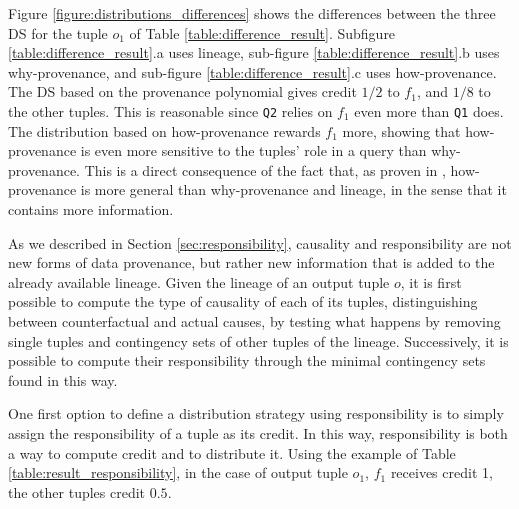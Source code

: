 Figure \ref{figure:distributions_differences} shows the differences between the three DS for the tuple $o_1$ of Table \ref{table:difference_result}. Subfigure \ref{table:difference_result}.a uses lineage, sub-figure \ref{table:difference_result}.b uses why-provenance, and sub-figure \ref{table:difference_result}.c uses how-provenance. 
The DS based on the provenance polynomial gives credit $1/2$ to $f_1$, and $1/8$ to the other tuples.
This is reasonable since \texttt{Q2} relies on $f_1$ even more than \texttt{Q1} does. 
The distribution based on how-provenance rewards $f_1$ more, showing that how-provenance is even more sensitive to the tuples' role in a query than why-provenance. %
This is a direct consequence of the fact that, as proven in \citep{howProvenanceGreen}, how-provenance is more general than why-provenance and lineage, in the sense that it contains more information. 

As we described in Section \ref{sec:responsibility}, causality and responsibility are not new forms of data provenance, but rather new information that is added to the already available lineage. 
Given the lineage of an output tuple $o$, it is first possible to compute the type of causality of each of its tuples, distinguishing between counterfactual and actual causes, by testing what happens by removing single tuples and contingency sets of other tuples of the lineage.
Successively, it is possible to compute their responsibility through the minimal contingency sets found in this way. 

One first option to define a distribution strategy using responsibility is to simply assign the responsibility of a tuple as its credit. In this way, responsibility is both a way to compute credit and to distribute it.
Using the example of Table \ref{table:result_responsibility}, in the case of output tuple $o_1$, $f_1$ receives credit 1, the other tuples credit $0.5$. 

